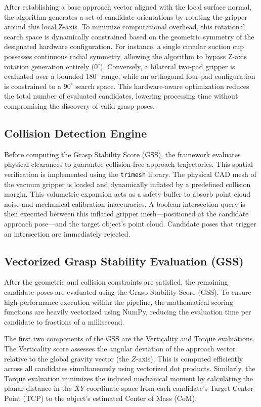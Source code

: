 After establishing a base approach vector aligned with the local surface normal, the algorithm generates a set of candidate orientations by rotating the gripper around this local Z-axis. To minimize computational overhead, this rotational search space is dynamically constrained based on the geometric symmetry of the designated hardware configuration. For instance, a single circular suction cup possesses continuous radial symmetry, allowing the algorithm to bypass Z-axis rotation generation entirely ($0^\circ$). Conversely, a bilateral two-pad gripper is evaluated over a bounded $180^\circ$ range, while an orthogonal four-pad configuration is constrained to a $90^\circ$ search space. This hardware-aware optimization reduces the total number of evaluated candidates, lowering processing time without compromising the discovery of valid grasp poses.


\subsection{Collision Detection Engine}

Before computing the Grasp Stability Score (GSS), the framework evaluates physical clearances to guarantee collision-free approach trajectories. This spatial verification is implemented using the \texttt{trimesh} library. The physical CAD mesh of the vacuum gripper is loaded and dynamically inflated by a predefined collision margin.  This volumetric expansion acts as a safety buffer to absorb point cloud noise and mechanical calibration inaccuracies. A boolean intersection query is then executed between this inflated gripper mesh—positioned at the candidate approach pose—and the target object's point cloud. Candidate poses that trigger an intersection are immediately rejected.



\subsection{Vectorized Grasp Stability Evaluation (GSS)}

After the geometric and collision constraints are satisfied, the remaining candidate poses are evaluated using the Grasp Stability Score (GSS). To ensure high-performance execution within the pipeline, the mathematical scoring functions are heavily vectorized using NumPy, reducing the evaluation time per candidate to fractions of a millisecond.

The first two components of the GSS are the Verticality and Torque evaluations. The Verticality score assesses the angular deviation of the approach vector relative to the global gravity vector (the $Z$-axis). This is computed efficiently across all candidates simultaneously using vectorized dot products. Similarly, the Torque evaluation minimizes the induced mechanical moment by calculating the planar distance in the $XY$ coordinate space from each candidate's Target Center Point (TCP) to the object's estimated Center of Mass (CoM).

